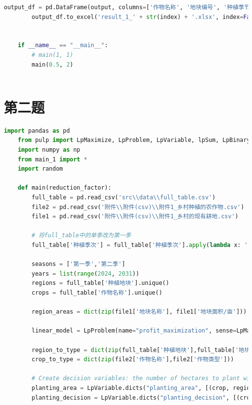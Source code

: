 \documentclass[withoutpreface]{cumcmthesis}
\begin{document}
\begin{appendices}
\begin{lstlisting}[language=python]
        output_df = pd.DataFrame(output, columns=['作物名称', '地块编号', '种植季节','年份', '种植数量'])
        output_df.to_excel('result_1_' + str(index) + '.xlsx', index=False)
    

    if __name__ == "__main__":
        # main(1, 1)
        main(0.5, 2)
    
\end{lstlisting}

\newpage
\section{第二题}
\begin{lstlisting}[language=python]
    import pandas as pd
    from pulp import LpMaximize, LpProblem, LpVariable, lpSum, LpBinary
    import numpy as np
    from main_1 import *
    import random
    
    def main(reduction_factor):
        full_table = pd.read_csv('src\\data\\full_table.csv')
        file2 = pd.read_csv('附件\\附件(csv)\\附件1_乡村种植的农作物.csv')
        file1 = pd.read_csv('附件\\附件(csv)\\附件1_乡村的现有耕地.csv')
        
        # 将full_table中的单季改为第一季
        full_table['种植季次'] = full_table['种植季次'].apply(lambda x: '第一季' if x == '单季' else x)
    
        seasons = ['第一季','第二季']
        years = list(range(2024, 2031))
        regions = full_table['种植地块'].unique()
        crops = full_table['作物名称'].unique()
    
        region_areas = dict(zip(file1['地块名称'], file1['地块面积/亩']))
        
        linear_model = LpProblem(name="profit_maximization", sense=LpMaximize)
        
        region_to_type = dict(zip(full_table['种植地块'],full_table['地块类型']))
        crop_to_type = dict(zip(file2['作物名称'],file2['作物类型']))
    
        # Create decision variables: the number of hectares to plant with [each crop] in [each region] at [each year] at [each season] and the decision to plant or not
        planting_area = LpVariable.dicts("planting_area", [(crop, region, year, season) for crop in crops for region in regions for year in years for season in seasons], lowBound=0, cat='Continuous')
        planting_decision = LpVariable.dicts("planting_decision", [(crop, region, year, season) for crop in crops for region in regions for year in years for season in seasons], cat='Binary')
    

\end{lstlisting}
\end{appendices}
\end{document}
